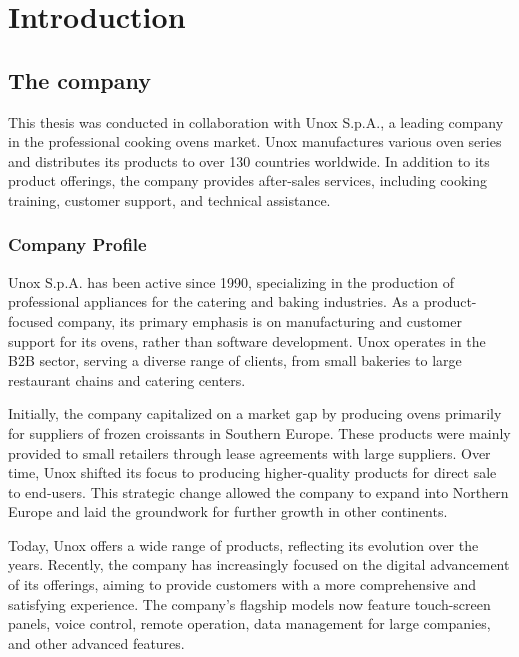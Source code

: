 
\chapter{Introduction}
\label{chp:intro}

\section{The company}

This thesis was conducted in collaboration with Unox S.p.A., a leading company in the professional cooking ovens market. Unox manufactures various oven series and distributes its products to over 130 countries worldwide. In addition to its product offerings, the company provides after-sales services, including cooking training, customer support, and technical assistance.

\subsection{Company Profile}

Unox S.p.A. has been active since 1990, specializing in the production of professional appliances for the catering and baking industries. As a product-focused company, its primary emphasis is on manufacturing and customer support for its ovens, rather than software development. Unox operates in the \ac{B2B} sector, serving a diverse range of clients, from small bakeries to large restaurant chains and catering centers.

Initially, the company capitalized on a market gap by producing ovens primarily for suppliers of frozen croissants in Southern Europe. These products were mainly provided to small retailers through lease agreements with large suppliers. Over time, Unox shifted its focus to producing higher-quality products for direct sale to end-users. This strategic change allowed the company to expand into Northern Europe and laid the groundwork for further growth in other continents.

Today, Unox offers a wide range of products, reflecting its evolution over the years. Recently, the company has increasingly focused on the digital advancement of its offerings, aiming to provide customers with a more comprehensive and satisfying experience. The company's flagship models now feature touch-screen panels, voice control, remote operation, data management for large companies, and other advanced features.

